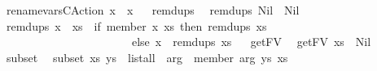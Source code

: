 \begin{isabellebody}
{\isacharbar}\ {\isachardoublequoteopen}rename{\isacharunderscore}vars{\isacharunderscore}CAction\ x\ {\isacharequal}\ x{\isachardoublequoteclose}\isanewline
\isanewline
\ \isanewline
{}\isamarkupfalse%
\ remdups\isanewline
{}\isanewline
\ \ {\isachardoublequoteopen}remdups\ Nil\ {\isacharequal}\ Nil{\isachardoublequoteclose}\isanewline
{\isacharbar}\ {\isachardoublequoteopen}remdups\ {\isacharparenleft}x\ {\isacharhash}\ xs{\isacharparenright}\ {\isacharequal}\ {\isacharparenleft}if\ {\isacharparenleft}member\ x\ xs{\isacharparenright}\ then\ remdups\ xs\isanewline
\ \ \ \ \ \ \ \ \ \ \ \ \ \ \ \ \ \ \ \ \ \ \ else\ x\ {\isacharhash}\ remdups\ xs{\isacharparenright}{\isachardoublequoteclose}\isanewline
\isanewline
\ \isanewline
{}\isamarkupfalse%
\ getFV\isanewline
{}\isanewline
\ \ {\isachardoublequoteopen}getFV\ xs\ {\isacharequal}\ Nil{\isachardoublequoteclose}\isanewline
\isanewline
\ \isanewline
{}\isamarkupfalse%
\ subset\isanewline
{}\isanewline
\ \ {\isachardoublequoteopen}subset\ xs\ ys\ {\isacharequal}\ list{\isacharunderscore}all\ {\isacharparenleft}{\isacharpercent}\ arg{}\ {\isachardot}\ member\ arg{}\ ys{\isacharparenright}\ xs{\isachardoublequoteclose}\isanewline
\isanewline
%
\isadelimtheory
\isanewline
%
\endisadelimtheory
%
\isatagtheory
{}\isamarkupfalse%
%
\endisatagtheory
{\isafoldtheory}%
%
\isadelimtheory
%
\endisadelimtheory
%
\end{isabellebody}%
